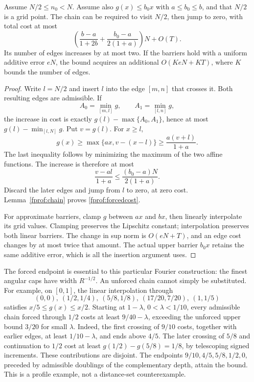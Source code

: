 \begin{lemma}\label{fprof:forced}
Assume \(N/2\leq n_0<N\). Assume also \(g(x)\leq b_0x\) with \(a\leq b_0\leq b\), and that \(N/2\) is a grid point. The chain can be required to visit \(N/2\), then jump to zero, with total cost at most
\begin{equation}\label{fprof:forcedcost}
 \left(\frac{b-a}{1+2b}+\frac{b_0-a}{2(1+a)}\right)N+O(T).
\end{equation}
Its number of edges increases by at most two. If the barriers hold with a uniform additive error \(eN\), the bound acquires an additional \(O(KeN+KT)\), where \(K\) bounds the number of edges.
\end{lemma}
\begin{proof}
Write \(l=N/2\) and insert \(l\) into the edge \([m,n]\) that crosses it. Both resulting edges are admissible. If
$$
 A_0=\min_{[m,l]}g,\qquad A_1=\min_{[l,n]}g,
$$
the increase in cost is exactly \(g(l)-\max\{A_0,A_1\}\), hence at most \(g(l)-\min_{[l,N]}g\). Put \(v=g(l)\). For \(x\geq l\),
$$
 g(x)\geq\max\{ax,v-(x-l)\}\geq\frac{a(v+l)}{1+a}.
$$
The last inequality follows by minimizing the maximum of the two affine functions. The increase is therefore at most
$$
 \frac{v-al}{1+a}\leq\frac{(b_0-a)N}{2(1+a)}.
$$
Discard the later edges and jump from \(l\) to zero, at zero cost. Lemma~\ref{fprof:chain} proves \eqref{fprof:forcedcost}.

For approximate barriers, clamp \(g\) between \(ax\) and \(bx\), then linearly interpolate its grid values. Clamping preserves the Lipschitz constant; interpolation preserves both linear barriers. The change in sup norm is \(O(eN+T)\), and an edge cost changes by at most twice that amount. The actual upper barrier \(b_0x\) retains the same additive error, which is all the insertion argument uses.
\end{proof}

The forced endpoint is essential to this particular Fourier construction: the finest angular caps have width \(R^{-1/2}\). An unforced chain cannot simply be substituted. For example, on \([0,1]\), the linear interpolation through
$$
 (0,0),\ (1/2,1/4),\ (5/8,1/8),\ (17/20,7/20),\ (1,1/5)
$$
satisfies \(x/5\leq g(x)\leq x/2\). Starting at \(1-\lambda\), \(0<\lambda<1/10\), every admissible chain forced through \(1/2\) costs at least \(9/40-\lambda\), exceeding the unforced upper bound \(3/20\) for small \(\lambda\). Indeed, the first crossing of \(9/10\) costs, together with earlier edges, at least \(1/10-\lambda\), and ends above \(4/5\). The later crossing of \(5/8\) and continuation to \(1/2\) cost at least \(g(1/2)-g(5/8)=1/8\), by telescoping signed increments. These contributions are disjoint. The endpoints \(9/10,4/5,5/8,1/2,0\), preceded by admissible doublings of the complementary depth, attain the bound. This is a profile example, not a distance-set counterexample.

